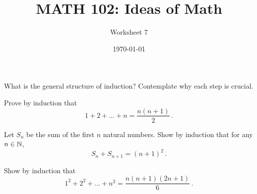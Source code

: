 \documentclass[12pt]{amsart}
\title{ MATH 102: Ideas  of Math }
\author{ Worksheet 7 }
\date{\today}
\begin{document}
\maketitle


\begin{question}
	What is the general structure of induction?
	Contemplate why each step is crucial.
\end{question}


\newpage


\begin{question}
	Prove by induction that
	\begin{equation*}
		1+2+\dots + n = \frac{n(n+1)}{2} \,.
	\end{equation*}
\end{question}

\vspace{8cm}

\begin{question}
	Let $S_n$ be the sum of the first $n$ natural numbers.
	Show by induction that for any $n\in \mathbb{N}$,
	\begin{equation*}
		S_n + S_{n+1} = (n+1)^2 \,.
	\end{equation*}
\end{question}

\vspace{8cm}

\begin{question}
	Show by induction that
	\begin{equation*}
		1^2 + 2^2 + \dots + n^2 = \frac{n(n+1)(2n+1)}{6} \,.
	\end{equation*}
\end{question}
\end{document}

